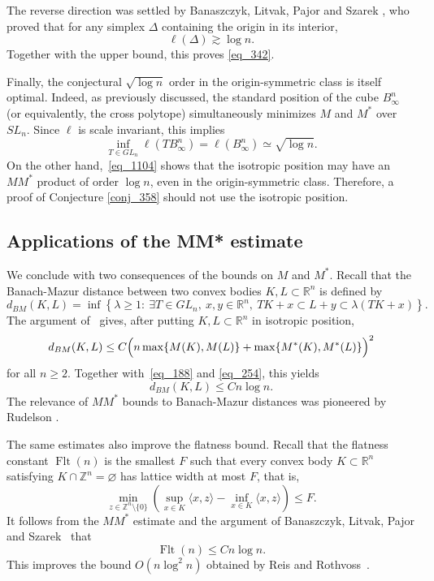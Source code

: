 \documentclass[12pt]{article}
\theoremstyle{definition}
\theoremstyle{remark}
\newcommand{\R}{\mathbb R}
\newcommand{\Z}{\mathbb Z}
\begin{document}
The reverse direction was settled by Banaszczyk, Litvak, Pajor and
Szarek  \cite{BanaszczykLitvakPajorSzarek}, who proved that for any simplex $\Delta$ containing the origin in its interior,
\[
  \ell(\Delta)\gtrsim\log n.
\]
Together with the upper bound, this proves
\eqref{eq_342}.

Finally, the conjectural $\sqrt{\log n}$ order in the origin-symmetric class is itself
optimal. Indeed, as previously discussed, the standard position of the cube $B_\infty^n$ (or equivalently, the cross polytope) simultaneously
minimizes $M$ and $M^*$ over $SL_n$. Since $\ell$ is scale invariant, this
implies
\[
  \inf_{T\in GL_n}\ell(TB_\infty^n)
  =\ell(B_\infty^n)
  \simeq\sqrt{\log n}.
\]
On the other hand,~\eqref{eq_1104} shows that the
isotropic position may have an $MM^*$ product of order $\log n$, even in the
origin-symmetric class. Therefore, a proof of Conjecture \ref{conj_358} should not use the isotropic position.

\subsection{Applications of the MM* estimate}

We conclude with two consequences of the bounds on $M$ and $M^*$.
Recall that the Banach-Mazur distance between two convex bodies
$K,L\subset\R^n$ is defined by
\[
  d_{BM}(K,L)
  =\inf\left\{\lambda\geq1:\ \exists T\in GL_n,\ x,y\in\R^n,
  \ TK+x\subset L+y\subset\lambda(TK+x)\right\}.
\]
The argument of~\cite{BizeulKlartag} gives, after putting
$K,L\subset\R^n$ in isotropic position,
\[
  d_{BM}(K,L)
  \leq C\Bigl(
  n\max\{M(K),M(L)\}
  +\max\{M^*(K),M^*(L)\}
  \Bigr)^2
\]
for all $n\geq2$. Together with~\eqref{eq_188} and
\eqref{eq_254}, this yields
\begin{equation}\label{eq_1250}
  d_{BM}(K,L)\leq Cn\log n.
\end{equation}
The relevance of $MM^*$ bounds to Banach-Mazur distances was pioneered by Rudelson \cite{Rudelson}.

The same estimates also improve the flatness bound. Recall that the
flatness constant $\operatorname{Flt}(n)$ is the smallest $F$ such
that every convex body $K\subset\R^n$ satisfying
$K\cap\Z^n=\varnothing$ has lattice width at most $F$, that is,
\[
  \min_{z\in\Z^n\setminus\{0\}}
  \left(
  \sup_{x\in K}\langle x,z\rangle
  -\inf_{x\in K}\langle x,z\rangle
  \right)
  \leq F.
\]
It follows from the $MM^*$ estimate and the argument of Banaszczyk,
Litvak, Pajor and Szarek~\cite{BanaszczykLitvakPajorSzarek} that
\begin{equation}\label{eq_1268}
  \operatorname{Flt}(n)\leq Cn\log n.
\end{equation}
This improves the bound $O(n\log^2 n)$ obtained by Reis and
Rothvoss~\cite{ReisRothvoss}.
\end{document}
